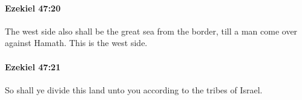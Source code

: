 		\paragraph{Ezekiel 47:20} %
			\label{EZEKIEL-47-20}

			The west side also shall be the great sea from the border, till a man come over against Hamath. This is the west side.


		\paragraph{Ezekiel 47:21} %
			\label{EZEKIEL-47-21}

			So shall ye divide this land unto you according to the tribes of Israel.


